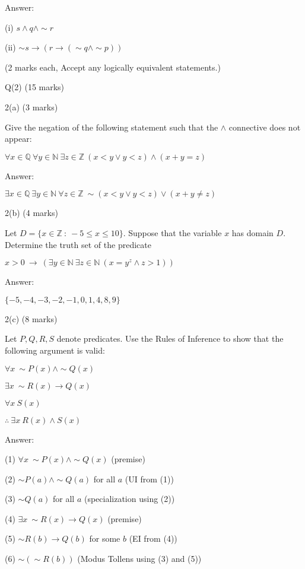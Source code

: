 \documentclass[a4paper,12pt,oneside]{book}
\theoremstyle{definition}
\begin{document}
Answer:

(i) $s \wedge q \wedge \sim r$

(ii) $\sim s \longrightarrow (r \longrightarrow (\sim q \wedge \sim p))$

(2 marks each, Accept any logically equivalent statements.)

\newpage

Q(2) (15 marks)

2(a) (3 marks)

Give the negation of the following statement such that the $\wedge$ connective does not appear:

$\forall x \in \mathbb{Q} \ \forall y \in \mathbb{N} \ \exists z \in \mathbb{Z} \ (x<y \vee y<z) \wedge (x+y=z)$

Answer:

$\exists x \in \mathbb{Q} \ \exists y \in \mathbb{N} \ \forall z \in \mathbb{Z} \ \sim (x<y \vee y<z) \vee (x+y \neq z)$

2(b)  (4 marks)

Let $D = \{ x \in \mathbb{Z} \ : \ -5 \leq x \leq 10 \}$. Suppose that the variable $x$ has domain $D$. Determine the truth set of the predicate

$x > 0 \ \longrightarrow \ (\exists y \in \mathbb{N} \ \exists z \in \mathbb{N} \ (x=y^z \wedge z>1) )$

Answer:

$\{ -5,-4,-3,-2,-1,0,1,4,8,9 \}$

2(c) (8 marks)

Let $P,Q,R,S$ denote predicates. Use the Rules of Inference to show that the following argument is valid:

$\forall x \ \sim P(x) \wedge \sim Q(x)$

$\exists x \ \sim R(x) \longrightarrow Q(x)$

$\forall x \ S(x)$

$\therefore \ \exists x \ R(x) \wedge S(x)$ 

Answer:

(1) $\forall x \ \sim P(x) \wedge \sim Q(x)$ (premise)

(2) $\sim P(a) \wedge \sim Q(a)$ for all $a$ (UI from (1))

(3) $\sim Q(a)$ for all $a$ (specialization using (2))

(4) $\exists x \ \sim R(x) \longrightarrow Q(x)$ (premise)

(5) $\sim R(b) \longrightarrow Q(b)$ for some $b$ (EI from (4))

(6) $\sim (\sim R(b))$ (Modus Tollens using (3) and (5))
\end{document}
